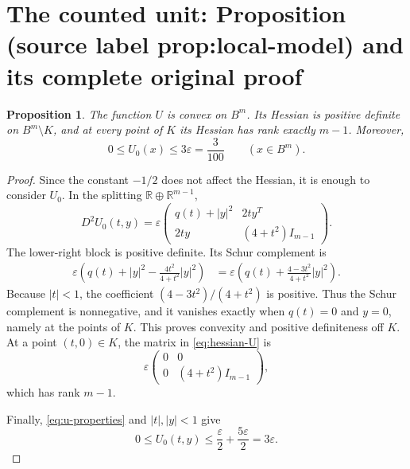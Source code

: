 \documentclass[10pt,a4paper]{amsart}
\newcommand{\R}{\mathbb R}
\theoremstyle{plain}
\newtheorem{proposition}[theorem]{Proposition}
\theoremstyle{remark}
\begin{document}
\section{The counted unit: Proposition (source label prop:local-model) and its complete original proof}

\begin{proposition}\label{prop:local-model}
The function $U$ is convex on $B^m$.  Its Hessian is positive definite on $B^m\setminus K$, and at every point of $K$ its Hessian has rank exactly $m-1$.  Moreover,
\begin{equation}\label{eq:U0-bound}
 0\leq U_0(x)\leq3\varepsilon=\frac3{100}
 \qquad (x\in B^m).
\end{equation}
\end{proposition}

\begin{proof}
Since the constant $-1/2$ does not affect the Hessian, it is enough to consider $U_0$.  In the splitting $\R\oplus\R^{m-1}$,
\begin{equation}\label{eq:hessian-U}
 D^2U_0(t,y)
 =\varepsilon
 \begin{pmatrix}
 q(t)+|y|^2 & 2t y^{T}\\
 2t y & (4+t^2)I_{m-1}
 \end{pmatrix}.
\end{equation}
The lower-right block is positive definite.  Its Schur complement is
\begin{align}
 \varepsilon\left(q(t)+|y|^2
 -\frac{4t^2}{4+t^2}|y|^2\right)
 &=\varepsilon\left(
 q(t)+\frac{4-3t^2}{4+t^2}|y|^2\right).\label{eq:schur}
\end{align}
Because $|t|<1$, the coefficient $(4-3t^2)/(4+t^2)$ is positive.  Thus the Schur complement is nonnegative, and it vanishes exactly when $q(t)=0$ and $y=0$, namely at the points of $K$.  This proves convexity and positive definiteness off $K$.  At a point $(t,0)\in K$, the matrix in \eqref{eq:hessian-U} is
\[
 \varepsilon
 \begin{pmatrix}
 0&0\\0&(4+t^2)I_{m-1}
 \end{pmatrix},
\]
which has rank $m-1$.

Finally, \eqref{eq:u-properties} and $|t|,|y|<1$ give
\[
 0\leq U_0(t,y)
 \leq\frac\varepsilon2+\frac{5\varepsilon}{2}
 =3\varepsilon.
\]
\end{proof}
\end{document}
